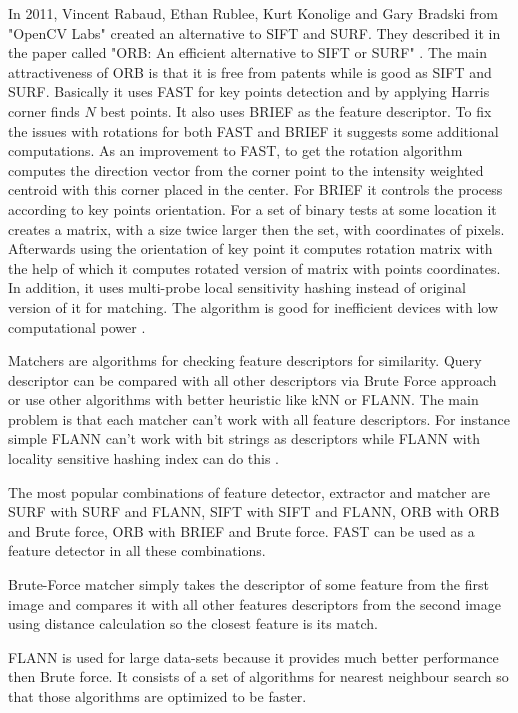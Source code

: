 \documentclass[../../../../main]{subfiles}
\begin{document}
In 2011, Vincent Rabaud, Ethan Rublee, Kurt Konolige and Gary Bradski from "OpenCV Labs" created an alternative to \ac{SIFT} and \ac{SURF}. They described it in the paper called "ORB: An efficient alternative to \ac{SIFT} or \ac{SURF}" \cite{orb_rublee}. The main attractiveness of \ac{ORB} is that it is free from patents while is good as \ac{SIFT} and \ac{SURF}. 
Basically it uses \ac{FAST} for key points detection and by applying Harris corner finds $N$ best points. It also uses \ac{BRIEF} as the feature descriptor. To fix the issues with rotations for both \ac{FAST} and \ac{BRIEF} it suggests some additional computations. As an improvement to \ac{FAST}, to get the rotation algorithm computes the direction vector from the corner point to the intensity weighted centroid with this corner placed in the center. For \ac{BRIEF} it controls the process according to key points orientation. For a set of binary tests at some location it creates a matrix, with a size twice larger then the set, with coordinates of pixels. Afterwards using the orientation of key point it computes rotation matrix with the help of which it computes rotated version of matrix with points coordinates. In addition, it uses multi-probe local sensitivity hashing instead of original version of it for matching. The algorithm is good for inefficient devices with low computational power \cite{opencv_docs_orb}.

Matchers are algorithms for checking feature descriptors for similarity. Query descriptor can be compared with all other descriptors via Brute Force approach or use other algorithms with better heuristic like \ac{kNN} or \ac{FLANN}. The main problem is that each matcher can't work with all feature descriptors. For instance simple \ac{FLANN} can't work with bit strings as descriptors while \ac{FLANN} with locality sensitive hashing index can do this \cite{opencv_docs_matchers}.

The most popular combinations of feature detector, extractor and matcher are \ac{SURF} with \ac{SURF} and \ac{FLANN}, \ac{SIFT} with \ac{SIFT} and \ac{FLANN}, \ac{ORB} with \ac{ORB} and Brute force, \ac{ORB} with \ac{BRIEF} and Brute force. \ac{FAST} can be used as a feature detector in all these combinations.

Brute-Force matcher simply takes the descriptor of some feature from the first image and compares it with all other features descriptors from the second image using distance calculation so the closest feature is its match.

\ac{FLANN} is used for large data-sets because it provides much better performance then Brute force. It consists of a set of algorithms for nearest neighbour search so that those algorithms are optimized to be faster.
\end{document}

